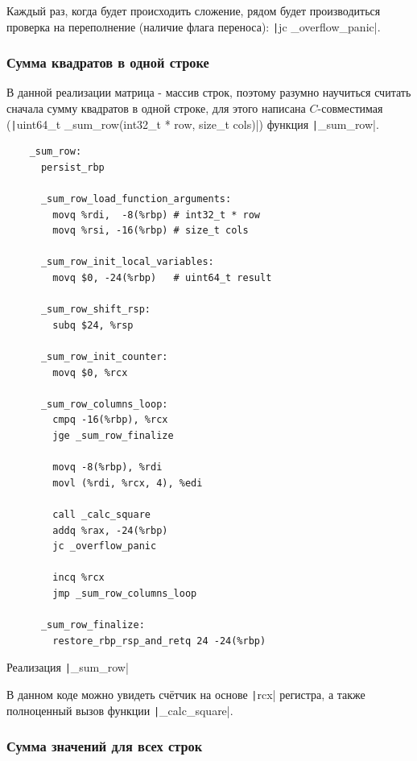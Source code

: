 \documentclass[a4paper]{article}
\begin{document}
  Каждый раз, когда будет происходить сложение, рядом будет производиться проверка на переполнение (наличие флага переноса):
  \texttt|jc _overflow_panic|.

  \subsubsection{Сумма квадратов в одной строке}

  В данной реализации матрица - массив строк, поэтому разумно научиться считать
  сначала сумму квадратов в одной строке, для этого написана $C$-совместимая
  (\texttt|uint64_t _sum_row(int32_t * row, size_t cols)|) функция \texttt|_sum_row|.

  \begin{listing}[H]
    \begin{verbatim}
    _sum_row:
      persist_rbp 
    
      _sum_row_load_function_arguments:
        movq %rdi,  -8(%rbp) # int32_t * row
        movq %rsi, -16(%rbp) # size_t cols
    
      _sum_row_init_local_variables:
        movq $0, -24(%rbp)   # uint64_t result
    
      _sum_row_shift_rsp:
        subq $24, %rsp
    
      _sum_row_init_counter:
        movq $0, %rcx
    
      _sum_row_columns_loop:
        cmpq -16(%rbp), %rcx
        jge _sum_row_finalize
    
        movq -8(%rbp), %rdi
        movl (%rdi, %rcx, 4), %edi
    
        call _calc_square
        addq %rax, -24(%rbp)
        jc _overflow_panic
    
        incq %rcx
        jmp _sum_row_columns_loop
    
      _sum_row_finalize:
        restore_rbp_rsp_and_retq 24 -24(%rbp)
    \end{verbatim}
    \caption{Реализация \texttt|_sum_row|}
  \end{listing}

  В данном коде можно увидеть счётчик на основе \texttt|rcx| регистра, 
  а также полноценный вызов функции \texttt|_calc_square|.

  \subsubsection{Сумма значений для всех строк}
\end{document}

